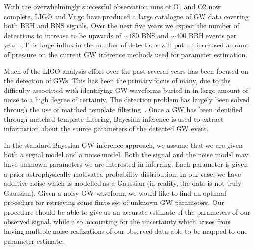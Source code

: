 \documentclass[%
showpacs,
 amsmath,amssymb,
 aps,
 twocolumn,
 prl,
 reprint,
floatfix,
]{revtex4-1}
\begin{document}
%
%
%
With the overwhelmingly successful observation runs of O1 and O2 now complete,
\ac{LIGO} and Virgo have produced a large catalogue of \ac{GW} data covering
both \ac{BBH} and \ac{BNS} signals\cite{1811.12907}. Over the next five years
we expect the number of detections to increase to be upwards of $\sim180$
\ac{BNS} and $\sim400$ BBH events per year~\cite{1304.0670,1811.12907}. This
large influx in the number of detections will put an increased amount of
pressure on the current \ac{GW} inference methods used for parameter
estimation.  

%
%
Much of the \ac{LIGO} analysis effort over the past several years has been
focused on the detection of \ac{GW}s. This has been the primary focus of many,
due to the difficulty associated with identifying \ac{GW} waveforms buried in
in large amount of noise to a high degree of certainty. The detection problem
has largely been solved through the use of matched template
filtering~\cite{0264-9381-33-21-215004}. Once a \ac{GW} has been identified
through matched template filtering, Bayesian inference is used to extract
information about the source parameters of the detected \ac{GW} event.

%
%
In the standard Bayesian \ac{GW} inference approach, we assume that we are
given both a signal model and a noise model. Both the signal and the 
noise model may have unknown parameters we are interested in inferring. 
Each parameter is given a prior astrophysically motivated probability 
distribution. In our case, we have additive noise which is modelled as 
a Gaussian (in reality, the data is not truly Gaussian). Given a noisy
\ac{GW} waveform, we would like to find an optimal procedure for retrieving
some finite set of unknown \ac{GW} parameters. Our procedure should be able
to give us an accurate estimate of the parameters of our observed signal, while
also accounting for the uncertainty which arises from having multiple noise
realizations of our observed data able to be mapped to one parameter
estimate.
\end{document}
